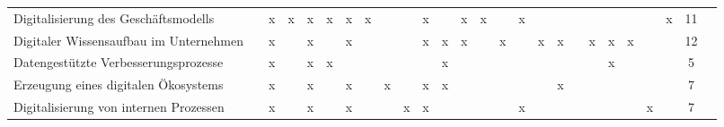 \begin{sidewaystable}[ht]
\begin{tabular}{|p{6.5cm}|c|c|c|c|c|c|c|c|c|c|c|c|c|c|c|c|c|c|c|c|c|c|c|c|c|}
		Digitalisierung des Geschäftsmodells     &                   & x                  & x                  & x                    & x                  & x                 & x                 &                      &                    & x                    &                  & x                & x                   &                  & x               &                      &                    &                 &                  &                  &                        &                      & x                      & 11 \\
		Digitaler Wissensaufbau im Unternehmen              &                   & x                  &                    & x                    &                    & x                 &                   &                      &                    & x                    & x                & x                &                     & x                &                 & x                    & x                  &                 & x                & x                & x                      &                      &                        & 12 \\
		Datengestützte Verbesserungsprozesse    &                   & x                  &                    & x                    & x                  &                   &                   &                      &                    &                      & x                &                  &                     &                  &                 &                      &                    &                 &                  & x                &                        &                      &                        & 5  \\
		Erzeugung eines digitalen Ökosystems &                   & x                  &                    & x                    &                    & x                 &                   & x                    &                    & x                    & x                &                  &                     &                  &                 &                      & x                  &                 &                  &                  &                        &                      &                        & 7  \\
		Digitalisierung von internen Prozessen              &                   & x                  &                    & x                    &                    & x                 &                   &                      & x                  & x                    &                  &                  &                     &                  & x               &                      &                    &                 &                  &                  &                        & x                    &                        & 7  \\

\end{tabular}
\end{sidewaystable}
